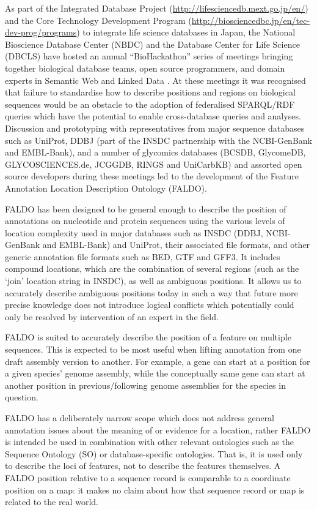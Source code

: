As part of the Integrated Database Project (\url{http://lifesciencedb.mext.go.jp/en/}) and
the Core Technology Development Program (\url{http://biosciencedbc.jp/en/tec-dev-prog/programs})
to integrate life science databases in Japan, the National Bioscience Database Center (NBDC) and the Database
Center for Life Science (DBCLS) have hosted an annual ``BioHackathon'' series
of meetings bringing together biological database teams, open source programmers,
and domain experts in Semantic Web and Linked Data \cite{BioHack2008,BioHack2009,BioHack2010,BioHack2011and2012}.
At these meetings it was recognised that failure to standardise how to describe positions
and regions on biological sequences would be an obstacle to the adoption of federalised
SPARQL/RDF queries which have the potential to enable cross-database queries and
analyses. Discussion and prototyping with representatives from major sequence databases
such as UniProt\cite{UniProt2013}, DDBJ\cite{DDBJ2013} (part of the INSDC partnership with the NCBI-GenBank\cite{GenBank2013} and EMBL-Bank\cite{ENA2013}),
and a number of glycomics databases 
(BCSDB\cite{doi:10.1021/ci100150d}, GlycomeDB\cite{Ranzinger01012011}, GLYCOSCIENCES.de\cite{Lutteke01052006}, JCGGDB, RINGS\cite{RINGS} and UniCarbKB\cite{UniCarbKB})
and assorted open source developers during these meetings
led to the development of the Feature Annotation Location Description Ontology (FALDO).

FALDO has been designed to be general enough to describe the position of annotations
on nucleotide and protein sequences using the various levels of location complexity used
in major databases such as INSDC (DDBJ, NCBI-GenBank and EMBL-Bank) and UniProt, their
associated file formats, and other generic annotation file formats such as BED,
GTF and GFF3. It includes compound locations, which are the combination of
several regions (such as the `join' location string in INSDC), as well as ambiguous
positions. It allows us to accurately describe ambiguous positions today
in such a way that future more precise knowledge does not introduce logical conflicts 
which potentially could only be resolved by intervention of an expert in the field.

FALDO is suited to accurately describe the position of
a feature on multiple sequences.
This is expected to be most useful when lifting annotation from one
draft assembly version to another.
For example, a gene can start at a position for a given species' genome assembly,
while the conceptually same gene can start at another position in previous/following genome assemblies for the species in question.

FALDO has a deliberately narrow scope which does not address general annotation
issues about the meaning of or evidence for a location, rather FALDO is intended be
used in combination with other relevant ontologies such as the Sequence Ontology
(SO) \cite{SequenceOntology2005} or database-specific ontologies.
That is, it is used only to describe the loci of features, not to describe the features themselves.
A FALDO position relative to a sequence record is comparable to a
coordinate position on a map: it makes no claim about how that
sequence record or map is related to the real world.
 
